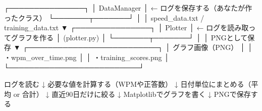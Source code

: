 ┌───────────────┐
│ DataManager    │  ← ログを保存する（あなたが作ったクラス）
└───────┬───────┘
        │
        │ speed_data.txt / training_data.txt
        ▼
┌───────────────┐
│ Plotter        │  ← ログを読み取ってグラフを作る
│  (plotter.py)  │
└───────┬───────┘
        │
        │ PNGとして保存
        ▼
┌──────────────────────────┐
│ グラフ画像（PNG）         │
│ ・wpm_over_time.png       │
│ ・training_scores.png     │     
└──────────────────────────┘


ログを読む
   ↓
必要な値を計算する（WPMや正答数）
   ↓
日付単位にまとめる（平均 or 合計）
   ↓
直近90日だけに絞る
   ↓
Matplotlibでグラフを書く
   ↓
PNGで保存する